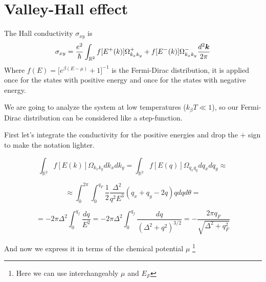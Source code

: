 \section{Valley-Hall effect}
The Hall conductivity $\sigma_{xy}$ is 
\begin{equation}
    \sigma_{xy}=\frac{e^2}\hbar \int_{\mathbb R^2} f[E^+(k)]\Omega^+_{k_xk_y}+f[E^-(k)]\Omega^-_{k_xk_y}\frac{d^2\boldsymbol{k}}{2\pi}
    \label{eq:valley-conductivity-1}
\end{equation}
Where $f(E)=\big[e^{\beta (E-\mu)}+1\big]^{-1}$ is the Fermi-Dirac distribution, it is applied once for the states with positive energy and once for the states with negative energy.

We are going to analyze the system at low temperatures ($k_\beta T\ll 1$), so our Fermi-Dirac distribution can be considered like a step-function.

First let's integrate the conductivity for the positive energies and drop the $+$ sign to make the notation lighter.

\[
    \int_{\mathbb R^2} f[E(k)]\Omega_{k_xk_y}dk_xdk_y=\int_{\mathbb R^2} f[E(q)]\Omega_{q_xq_y}dq_xdq_y\approx
\]

\[
    \approx\int_{0}^{2\pi}\int_{0}^{q_F}\frac12 \frac{\Delta^2}{q^2E^3}(q_x+q_y-2q)qdqd\theta=
\]

\[
    =-2\pi\Delta^2\int_0^{q_f}\frac{dq}{E^2} =-2\pi\Delta^2\int_0^{q_f}\frac{dq}{(\Delta^2+q^2)^{3/2}}= 
    -\frac{2\pi q_F}{\sqrt{\Delta^2+q_F^2}}
\]

And now we express it in terms of the chemical potential $\mu$ \footnote{Here we can use interchangeably $\mu$ and $E_F$}


